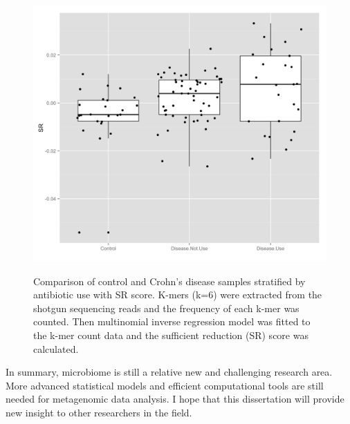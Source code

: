\begin{figure}[p]
\centering
{\includegraphics[scale=0.25,trim=0 0 0 0,clip]{Figure/F52_SR_control_disease_antibiotics.png}
}
\caption[Comparison of control and Crohn's disease samples stratified by antibiotic use with SR score]{Comparison of control and Crohn's disease samples stratified by antibiotic use with SR score.  K-mers (k=6) were extracted from the shotgun sequencing reads and the frequency of each k-mer was counted. Then multinomial inverse regression model was fitted to the k-mer count data and the sufficient reduction (SR) score was calculated. 
}
\label{F52_SR_control_disease_antibiotics}
\end{figure}

In summary, microbiome is still a relative new and challenging research area. More advanced statistical models and efficient computational tools are still needed for metagenomic data analysis. I hope that this dissertation will provide new insight to other researchers in the field. 